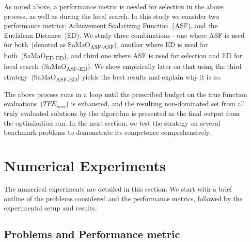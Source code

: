\documentclass[twocolumn,10pt]{asme2ej}
\begin{document}
As noted above, a performance metric is needed for selection in the above process, as well as during the local search. In this study we consider two performance metrics: Achievement Scalarizing Function~(ASF), and the Euclidean Distance~(ED). We study three combinations - one where ASF is used for both~(denoted as SaMaO\textsubscript{ASF-ASF}), another where ED is used for both~(SaMaO\textsubscript{ED-ED}), and third one where ASF is used for selection and ED for local search~(SaMaO\textsubscript{ASF-ED}). We show empirically later on that using the third strategy~(SaMaO\textsubscript{ASF-ED}) yields the best results and explain why it is so.

The above process runs in a loop until the prescribed budget on the true function evaluations~($TFE_{max}$) is exhausted, and the resulting non-dominated set from all truly evaluated solutions by the algorithm is presented as the final output from the optimization run. In the next section, we test the strategy on several benchmark problems to demonstrate its competence comprehensively. 

\section{Numerical Experiments}
\label{sec:KHTsec:4}

The numerical experiments are detailed in this section. We start with a brief outline of the problems considered and the performance metrics, followed by the experimental setup and results. 

\subsection{Problems and Performance metric}
\end{document}
